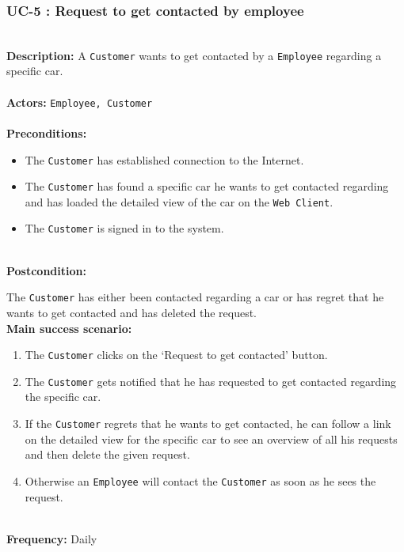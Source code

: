 \subsubsection{UC-5 : Request to get contacted by employee}
\label{request-contact-use-case}
\HRule \\[0.4cm]
\textbf{Description:} A \texttt{Customer} wants to get contacted by a \texttt{Employee} regarding a specific car. \\
\HRule \\[0.4cm]
\textbf{Actors:} \texttt{Employee, Customer}\\
\HRule \\[0.4cm]
\textbf{Preconditions:} 
\begin{itemize}
    \item The \texttt{Customer} has established connection to the Internet.
    \item The \texttt{Customer} has found a specific car he wants to get contacted regarding and has loaded the detailed view of the car on the \texttt{Web Client}.
    \item The \texttt{Customer} is signed in to the system.
\end{itemize}
\HRule \\[0.4cm]
\textbf{Postcondition:}
\begin{itemize}
\end{itemize}
    \item The \texttt{Customer} has either been contacted regarding a car or has regret that he wants to get contacted and has deleted the request.
\HRule \\[0.4cm]
\textbf{Main success scenario:}
\begin{enumerate}
    \item The \texttt{Customer} clicks on the `Request to get contacted' button.
    \item The \texttt{Customer} gets notified that he has requested to get contacted regarding the specific car.
    \item If the \texttt{Customer} regrets that he wants to get contacted, he can follow a link on the detailed view for the specific car to see an overview of all his requests and then delete the given request.
    \item Otherwise an \texttt{Employee} will contact the \texttt{Customer} as soon as he sees the request.
\end{enumerate}

\HRule \\[0.4cm]
\textbf{Frequency:}
Daily \\
\HRule \\[0.4cm]


